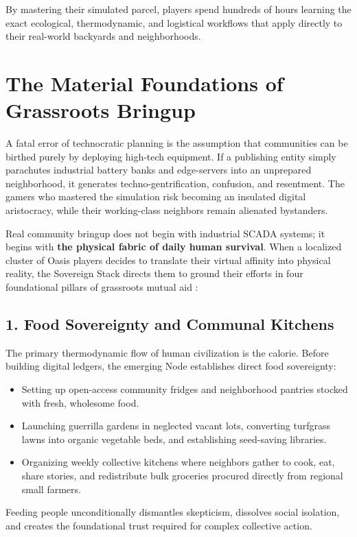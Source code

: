 By mastering their simulated parcel, players spend hundreds of hours learning the exact ecological, thermodynamic, and logistical workflows that apply directly to their real-world backyards and neighborhoods.


\section{The Material Foundations of Grassroots Bringup}
\label{sec:grassroots-bringup}

A fatal error of technocratic planning is the assumption that communities can be birthed purely by deploying high-tech equipment. If a publishing entity simply parachutes industrial battery banks and edge-servers into an unprepared neighborhood, it generates techno-gentrification, confusion, and resentment. The gamers who mastered the simulation risk becoming an insulated digital aristocracy, while their working-class neighbors remain alienated bystanders.

Real community bringup does not begin with industrial SCADA systems; it begins with \textbf{the physical fabric of daily human survival}. When a localized cluster of Oasis players decides to translate their virtual affinity into physical reality, the Sovereign Stack directs them to ground their efforts in four foundational pillars of grassroots mutual aid \parencite{kropotkin1902}:

\subsection{1. Food Sovereignty and Communal Kitchens}
The primary thermodynamic flow of human civilization is the calorie. Before building digital ledgers, the emerging Node establishes direct food sovereignty:
\begin{itemize}
    \item Setting up open-access community fridges and neighborhood pantries stocked with fresh, wholesome food.
    \item Launching guerrilla gardens in neglected vacant lots, converting turfgrass lawns into organic vegetable beds, and establishing seed-saving libraries.
    \item Organizing weekly collective kitchens where neighbors gather to cook, eat, share stories, and redistribute bulk groceries procured directly from regional small farmers.
\end{itemize}
Feeding people unconditionally dismantles skepticism, dissolves social isolation, and creates the foundational trust required for complex collective action.

